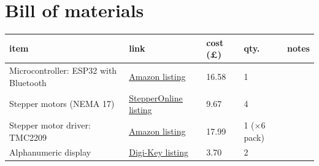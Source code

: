 \documentclass[10pt, a4paper]{article}
\begin{document}
\section{Bill of materials}
\begin{table}[H]
    \small
    \centering
    \begin{tabularx}{\linewidth}{>{\raggedright\arraybackslash}X l l l l}
        \toprule
        \textbf{item}  & \textbf{link}                                                                                                                                                         & \textbf{cost (£)} & \textbf{qty.}        & \textbf{notes} \\
        \midrule
        Microcontroller: ESP32 with Bluetooth
                       & \href{https://www.amazon.co.uk/diymore-DevKitC-1-Expansion-Development-Bluetooth-ESP32-S3-Breakout-Board/dp/B0FX3T2HN7}{\uline{Amazon listing}}
                       & 16.58                                                                                                                                                                 & 1                 &                                       \\

        Stepper motors (NEMA 17)
                       & \href{https://www.stepperonline.co.uk/3pcs-e-series-nema-17-bipolar-1-8deg-17ncm-24-07oz-in-1a-42x42x23mm-4-wires-3-17he08-1004s.html}{\uline{StepperOnline listing}}
                       & 9.67                                                                                                                                                                  & 4                 &                                       \\

        Stepper motor driver: TMC2209
                       & \href{https://www.amazon.co.uk/DIGISHUO-TMC2209-Stepsticks-Heatsink-Motherboard/dp/B0F93K9PKS}{\uline{Amazon listing}}
                       & 17.99                                                                                                                                                                 & 1 (×6 pack)       &                                       \\

        Alphanumeric display
                       & \href{https://www.digikey.co.uk/en/products/detail/kingbright/BA56-12SURKWA/4098538}{\uline{Digi-Key listing}}
                       & 3.70                                                                                                                                                                  & 2                 &                                       \\


\end{tabularx}
\end{table}
\end{document}
